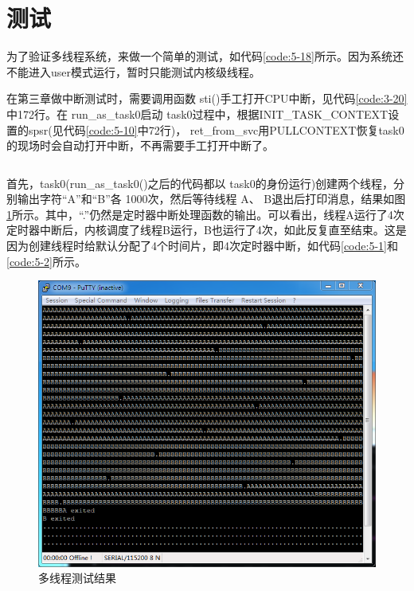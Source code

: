 \documentclass[main.tex]{subfiles}
\begin{document}
\begin{CJK*}{UTF8}{song}
\begin{code}
\label{code:5-17}
\inputminted[firstline=63,lastline=108,linenos,numbersep=5pt,frame=lines,framesep=2mm]{c}{src/chapter05/kernel/task.c}
\end{code}

\section{测试}
为了验证多线程系统，来做一个简单的测试，如代码\ref{code:5-18}所示。因为系统还不能进入user模式运行，暂时只能测试内核级线程。

\par
在第三章做中断测试时，需要调用函数 sti()手工打开CPU中断，见代码\ref{code:3-20}中172行。在 run\_\-as\_\-task0启动 task0过程中，根据INIT\_\-TASK\_\-CONTEXT设置的spsr(见代码\ref{code:5-10}中72行)， ret\_\-from\_\-svc用PULL\-CONTEXT恢复task0的现场时会自动打开中断，不再需要手工打开中断了。

\begin{code}
\label{code:5-18}
\inputminted[firstline=501,lastline=537,linenos,numbersep=5pt,frame=lines,framesep=2mm]{c}{src/chapter05/kernel/machdep.c}
\end{code}

首先，task0(run\_\-as\_\-task0()之后的代码都以 task0的身份运行)创建两个线程，分别输出字符“A”和“B”各 1000次，然后等待线程 A、 B退出后打印消息，结果如图\ref{figure:5-3}所示。其中，“.”仍然是定时器中断处理函数的输出。可以看出，线程A运行了4次定时器中断后，内核调度了线程B运行，B也运行了4次，如此反复直至结束。这是因为创建线程时给默认分配了4个时间片，即4次定时器中断，如代码\ref{code:5-1}和\ref{code:5-2}所示。

\begin{figure}[htp]
\centering
\includegraphics[scale=0.4]{figures/5-3}
\caption{多线程测试结果}
\label{figure:5-3}
\end{figure}


\end{CJK*}
\end{document}
